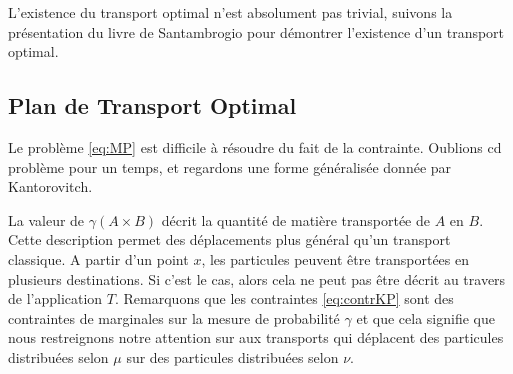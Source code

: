 \documentclass[a4paper,12pt]{article}
\begin{document}
\vspace{0.3cm}

L'existence du transport optimal n'est absolument pas trivial, suivons la présentation du livre de Santambrogio  \cite{santambrogio2015optimal} pour démontrer l'existence d'un transport optimal.

\subsection{Plan de Transport Optimal}
Le problème \eqref{eq:MP} est difficile à résoudre du fait de la contrainte. Oublions cd problème pour un temps, et regardons une forme généralisée donnée par Kantorovitch. \\

\vspace{0.3cm}

La valeur de $\gamma (A\times B)$ décrit la quantité de matière transportée de $A$ en $B$. Cette description permet des déplacements plus général qu'un transport classique. A partir d'un point $x$, les particules peuvent être transportées en plusieurs destinations. Si c'est le cas, alors cela ne peut pas être décrit au travers de l'application $T$. Remarquons que les contraintes \eqref{eq:contrKP} sont des contraintes de marginales sur la mesure de probabilité $\gamma$ et que cela signifie que nous restreignons notre attention sur aux transports qui déplacent des particules distribuées selon $\mu$ sur des particules distribuées selon $\nu$.
\end{document}
